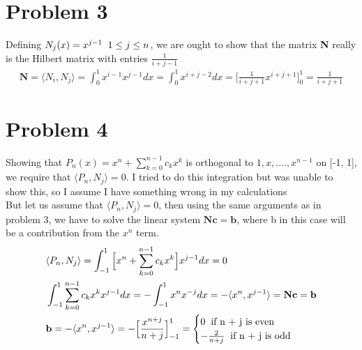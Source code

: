 \documentclass[a4paper,norsk]{article}
\begin{document}
\section*{Problem 3}
Defining $N_j(x) = x^{j-1} \hspace{2mm} 1 \leq j \leq n$, we are ought to show that the matrix \textbf{N} really is the Hilbert matrix with entries $\frac{1}{i + j - 1}$
\begin{align*}
\mathbf{N} = \langle N_i, N_j \rangle = \int_0^1 x^{i - 1} x^{j - 1} dx = \int_0^1 x^{i + j- 2} dx = \Big[\frac{1}{i+j+1} x^{i+j+1} \Big]_0^1 = \frac{1}{i+j+1} 
\end{align*}

\section*{Problem 4}
Showing that $P_n(x) = x^n + \sum_{k=0}^{n-1} c_k x^k$ is orthogonal to $1, x, ...., x^{n-1}$ on [-1, 1], we require that $\langle P_n,  N_j\rangle = 0$. I tried to do this integration but was unable to show this, so I assume I have something wrong in my calculations\\
But let us assume that $\langle P_n,  N_j\rangle = 0$, then using the same arguments as in problem 3, we have to solve the linear system $\mathbf{Nc = b}$, where b in this case will be a contribution from the $x^n$ term.
\begin{align*}
&\langle P_n,  N_j\rangle = \int_{-1}^1  \Big[x^n + \sum_{k=0}^{n-1} c_k x^k\Big]x^{j-1} dx = 0 \\
 &\int_{-1}^1 \sum_{k=0}^{n-1} c_k x^k x^{j-1} dx = -\int_{-1}^1  x^n x^{-j} dx = -\langle x^n, x^{j-1}\rangle = \mathbf{Nc} = \mathbf{b}  \\
 &\mathbf{b} = -\langle x^n, x^{j-1}\rangle = -\Big[\frac{x^{n+j} }{n+j} \Big]_{-1}^1  = 
 \begin{cases} 
      0 \hspace{2mm} \text{if n + j is even } \\
      -\frac{2}{n+j} \hspace{2mm} \text{if n + j is odd}
   \end{cases}
\end{align*}
\end{document}
